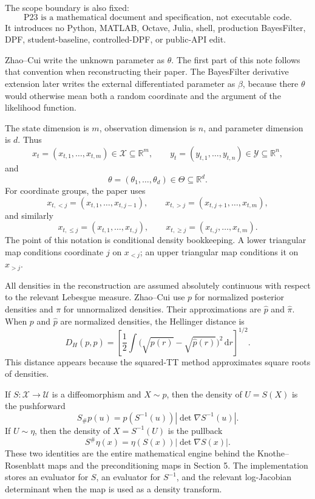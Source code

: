 \documentclass[11pt]{article}
\newcommand{\R}{\mathbb R}
\newcommand{\dd}{\,\mathrm d}
\begin{document}
The scope boundary is also fixed:
\[
    \text{P23 is a mathematical document and specification, not executable code}.
    \tag{P23-C3}
\]
It introduces no Python, MATLAB, Octave, Julia, shell, production
BayesFilter, DPF, student-baseline, controlled-DPF, or public-API edit.

Zhao--Cui write the unknown parameter as \(\theta\).  The first part of this
note follows that convention when reconstructing their paper.  The
BayesFilter derivative extension later writes the external differentiated
parameter as \(\beta\), because there \(\theta\) would otherwise mean both a
random coordinate and the argument of the likelihood function.

The state dimension is \(m\), observation dimension is \(n\), and parameter
dimension is \(d\).  Thus
\[
    x_t=(x_{t,1},\ldots,x_{t,m})\in\mathcal X\subseteq\R^m,
    \qquad
    y_t=(y_{t,1},\ldots,y_{t,n})\in\mathcal Y\subseteq\R^n,
\]
and
\[
    \theta=(\theta_1,\ldots,\theta_d)\in\Theta\subseteq\R^d.
\]
For coordinate groups, the paper uses
\[
    x_{t,<j}=(x_{t,1},\ldots,x_{t,j-1}),\qquad
    x_{t,>j}=(x_{t,j+1},\ldots,x_{t,m}),
    \tag{N1}
\]
and similarly
\[
    x_{t,\le j}=(x_{t,1},\ldots,x_{t,j}),\qquad
    x_{t,\ge j}=(x_{t,j},\ldots,x_{t,m}).
    \tag{N2}
\]
The point of this notation is conditional density bookkeeping.  A lower
triangular map conditions coordinate \(j\) on \(x_{<j}\); an upper triangular
map conditions it on \(x_{>j}\).

All densities in the reconstruction are assumed absolutely continuous with
respect to the relevant Lebesgue measure.  Zhao--Cui use \(p\) for normalized
posterior densities and \(\pi\) for unnormalized densities.  Their
approximations are \(\widehat p\) and \(\widehat\pi\).  When \(p\) and
\(\widehat p\) are normalized densities, the Hellinger distance is
\[
    D_H(p,\widehat p)
    =
    \left[
    \frac12
    \int
    \bigl(\sqrt{p(r)}-\sqrt{\widehat p(r)}\bigr)^2\dd r
    \right]^{1/2}.
    \tag{N3}
\]
This distance appears because the squared-TT method approximates square roots
of densities.

If \(S:\mathcal X\to\mathcal U\) is a diffeomorphism and \(X\sim p\), then
the density of \(U=S(X)\) is the pushforward
\[
    S_\#p(u)
    =
    p(S^{-1}(u))\left|\det\nabla S^{-1}(u)\right|.
    \tag{N4}
\]
If \(U\sim\eta\), then the density of \(X=S^{-1}(U)\) is the pullback
\[
    S^\#\eta(x)
    =
    \eta(S(x))\left|\det\nabla S(x)\right|.
    \tag{N5}
\]
These two identities are the entire mathematical engine behind the
Knothe--Rosenblatt maps and the preconditioning maps in Section 5.  The
implementation stores an evaluator for \(S\), an evaluator for \(S^{-1}\), and
the relevant log-Jacobian determinant when the map is used as a density
transform.
\end{document}

